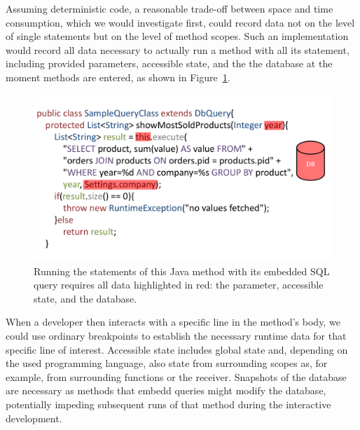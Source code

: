 Assuming deterministic code, a reasonable trade-off between space and time consumption, which we would investigate first, could record data not on the level of single statements but on the level of method scopes.
Such an implementation would record all data necessary to actually run a method with all its statement, including provided parameters, accessible state, and the the database at the moment methods are entered, as shown in Figure~\ref{fig:context_recording}.

\begin{figure}
    \includegraphics[width=\linewidth]{images/context}
    \caption{Running the statements of this Java method with its embedded SQL query requires all data highlighted in red: the parameter, accessible state, and the database.}
    \label{fig:context_recording}
\end{figure}

When a developer then interacts with a specific line in the method's body, we could use ordinary breakpoints to establish the necessary runtime data for that specific line of interest. 
Accessible state includes global state and, depending on the used programming language, also state from surrounding scopes as, for example, from surrounding functions or the receiver.
Snapshots of the database are necessary as methods that embedd queries might modify the database, potentially impeding subsequent runs of that method during the interactive development.

